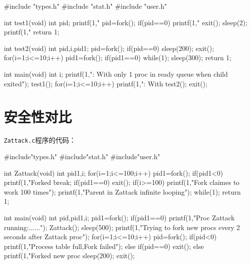 \documentclass{swfuthesism}
\begin{document}
\begin{ccode}
#include "types.h"
#include "stat.h"
#include "user.h"

int test1(void)
{
    int pid;
    printf(1,"%
    pid=fork();
    if(pid==0)
        {
            printf(1,"%
            exit();
        }
    sleep(2);   
    printf(1,"%
  return 1;
}

int test2(void)
{
    int pid,i,pid1;
    pid=fork();
    if(pid==0)
  {
    sleep(200);
    exit();
  }
    for(i=1;i<=10;i++)
        {
            pid1=fork();
            if(pid1==0){
                while(1);}
        }
  sleep(300);
  return 1;
}

int main(void)
{
  int i;
    printf(1,": With only 1 proc in ready queue when child exited\n");
    test1();
  for(i=1;i<=10;i++){
    printf(1,": With %
    test2();
  }
  exit();
}
\end{ccode}

\section{安全性对比}
\label{sec:seccmp}

\texttt{Zattack.c}程序的代码：

\begin{ccode}
#include"types.h"
#include"stat.h"
#include"user.h"

int Zattack(void)
{
    int pid1,i;
    for(i=1;i<=100;i++)
        {
            pid1=fork();
            if(pid1<0)
                {   printf(1,"Forked %
                    break;
                }
            if(pid1==0)
                {
                    exit();
                }
        }
    if(i>=100)
        printf(1,"Fork claimes to work 100 times\n");
    printf(1,"Parent in Zattack infinite looping\n");
    while(1);
    return 1;
}

int main(void)
{
    int pid,pid1,i;
    pid1=fork();
    if(pid1==0)
        {
            printf(1,"Proc Zattack running:\n......\n");
            Zattack();
        }
    sleep(500);
    printf(1,"Trying to fork new procs every 2 seconds after Zattack proc\n");
    for(i=1;i<=10;i++)
        {
            pid=fork();
            if(pid<0)
                {
                    printf(1,"Process table full,Fork failed\n");
                }
            else if(pid==0)
                exit();
            else
                printf(1,"Forked new proc %
            sleep(200);
        }
    exit();
}
\end{ccode}
\end{document}
